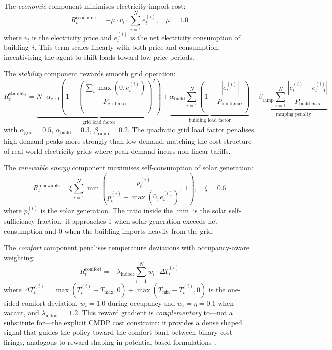 The \emph{economic} component minimises electricity import cost:
\begin{equation}
  R_t^{\text{economic}} = -\mu \cdot v_t \cdot \sum_{i=1}^{N} e_t^{(i)},
  \quad \mu = 1.0
  \label{eq:reward-economic}
\end{equation}
where $v_t$ is the electricity price and $e_t^{(i)}$ is the net electricity
consumption of building~$i$.  This term scales linearly with both price and
consumption, incentivising the agent to shift loads toward low-price periods.

The \emph{stability} component rewards smooth grid operation:
\begin{equation}
  R_t^{\text{stability}} = \underbrace{N \cdot \alpha_{\text{grid}} \left(
    1 - \left(\frac{\sum_i \max(0, e_t^{(i)})}{P_{\text{grid,max}}}\right)^2
  \right)}_{\text{grid load factor}}
  + \underbrace{\alpha_{\text{build}} \sum_{i=1}^{N} \left(
    1 - \frac{|e_t^{(i)}|}{P_{\text{build,max}}}
  \right)}_{\text{building load factor}}
  - \underbrace{\beta_{\text{ramp}} \sum_{i=1}^{N} \frac{|e_t^{(i)} - e_{t-1}^{(i)}|}{P_{\text{build,max}}}}_{\text{ramping penalty}}
  \label{eq:reward-stability}
\end{equation}
with $\alpha_{\text{grid}} = 0.5$, $\alpha_{\text{build}} = 0.3$,
$\beta_{\text{ramp}} = 0.2$.  The quadratic grid load factor penalises
high-demand peaks more strongly than low demand, matching the cost structure
of real-world electricity grids where peak demand incurs non-linear tariffs.

The \emph{renewable energy} component maximises self-consumption of solar
generation:
\begin{equation}
  R_t^{\text{renewable}} = \xi \sum_{i=1}^{N}
    \min\!\left(\frac{p_t^{(i)}}{p_t^{(i)} + \max(0, e_t^{(i)})},\; 1\right),
  \quad \xi = 0.6
  \label{eq:reward-renewable}
\end{equation}
where $p_t^{(i)}$ is the solar generation.  The ratio inside the $\min$ is the
solar self-sufficiency fraction: it approaches 1 when solar generation exceeds
net consumption and 0 when the building imports heavily from the grid.

The \emph{comfort} component penalises temperature deviations with
occupancy-aware weighting:
\begin{equation}
  R_t^{\text{comfort}} = -\lambda_{\text{indoor}} \sum_{i=1}^{N}
    w_i \cdot \Delta T_t^{(i)}
  \label{eq:reward-comfort}
\end{equation}
where $\Delta T_t^{(i)} = \max(T_t^{(i)} - T_{\max}, 0) + \max(T_{\min} -
T_t^{(i)}, 0)$ is the one-sided comfort deviation, $w_i = 1.0$ during
occupancy and $w_i = \eta = 0.1$ when vacant, and
$\lambda_{\text{indoor}} = 1.2$.  This reward gradient is \emph{complementary}
to---not a substitute for---the explicit CMDP cost constraint: it provides a
dense shaped signal that guides the policy toward the comfort band between
binary cost firings, analogous to reward shaping in potential-based
formulations~\cite{ng1999policy}.

